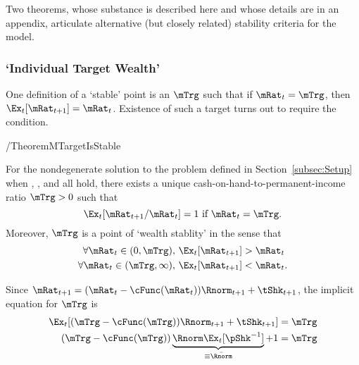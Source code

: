 \documentclass[BufferStockTheory]{subfiles}
\begin{document}
Two theorems, whose substance is described here and whose details are in an appendix, articulate alternative (but closely related) stability criteria for the model.

\subsubsection{`Individual Target Wealth'}\label{subsubsec:mTarget}
One definition of a `stable' point is an $\mTrg$ such that if $\mRat_{t}=\mTrg$, then $\Ex_{t}[\mRat_{t+1}]=\mRat_{t}$.  Existence of such a target turns out to require the {\GICNrm} condition.

\begin{verbatimwrite}{\EqDir/TheoremMTargetIsStable}
\begin{theorem}\label{thm:target}
  For the nondegenerate solution to the problem defined in Section~\ref{subsec:Setup} when {\FVAC}, {\WRIC}, and {\GICNrm} all hold, there exists a unique cash-on-hand-to-permanent-income ratio $\mTrg>0$ such that
  \begin{equation}
    \Ex_t [{\mRat}_{t+1}/\mRat_t] = 1 \mbox{~if~} \mRat_t = \mTrg.
    \label{eq:mTarget}
  \end{equation}
  Moreover, $\mTrg$ is a point of `wealth stablity' in the sense that
  \begin{align}\label{eq:stability}
    \forall {\mRat}_t\in(0,\mTrg),      \,\,& \Ex_t [{\mRat}_{t+1}] > {\mRat}_t  \\
    \forall {\mRat}_t\in(\mTrg,\infty), \,\,& \Ex_t [{\mRat}_{t+1}] < {\mRat}_t. \notag
  \end{align}
  \end{theorem}
\end{verbatimwrite}


 \hypertarget{mTargImplicit}{}

 Since $\mRat_{t+1}=(\mRat_{t}-\cFunc(\mRat_{t}))\Rnorm_{t+1}+\tShk_{t+1}$, the implicit equation for $\mTrg$ is
 \begin{align}
  \Ex_{t}[(\mTrg-\cFunc(\mTrg))\Rnorm_{t+1}+\tShk_{t+1}] & = \mTrg \label{eq:mTargImplicit}
\\   (\mTrg-\cFunc(\mTrg))\underbrace{\Rnorm\Ex_{t}[\pShk^{-1}]}_{\equiv \bar{\Rnorm}}+1 & = \mTrg \notag
 \end{align}
\end{document}
